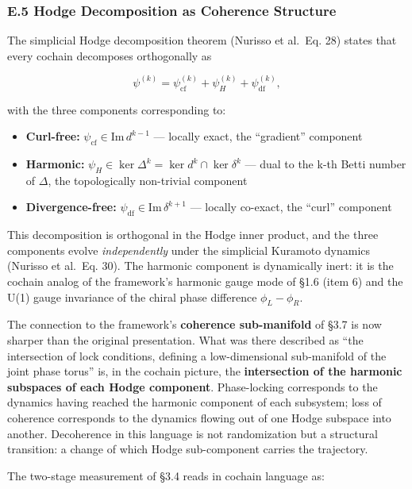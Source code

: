 \documentclass[
]{article}
\providecommand{\tightlist}{%
  \setlength{\itemsep}{0pt}\setlength{\parskip}{0pt}}
\begin{document}
\subsubsection{E.5 Hodge Decomposition as Coherence
Structure}\label{e.5-hodge-decomposition-as-coherence-structure}

The simplicial Hodge decomposition theorem (Nurisso et al.~Eq. 28)
states that every cochain decomposes orthogonally as

\[\boxed{\psi^{(k)} = \psi^{(k)}_{\text{cf}} + \psi^{(k)}_{H} +
\psi^{(k)}_{\text{df}},}\]

with the three components corresponding to:

\begin{itemize}
\tightlist
\item
  \textbf{Curl-free:} \(\psi_{\text{cf}} \in \text{Im}\,d^{k-1}\) ---
  locally exact, the ``gradient'' component
\item
  \textbf{Harmonic:}
  \(\psi_H \in \ker \Delta^k = \ker d^k \cap \ker \delta^k\) --- dual to
  the k-th Betti number of \(\Delta\), the topologically non-trivial
  component
\item
  \textbf{Divergence-free:}
  \(\psi_{\text{df}} \in \text{Im}\,\delta^{k+1}\) --- locally co-exact,
  the ``curl'' component
\end{itemize}

This decomposition is orthogonal in the Hodge inner product, and the
three components evolve \emph{independently} under the simplicial
Kuramoto dynamics (Nurisso et al.~Eq. 30). The harmonic component is
dynamically inert: it is the cochain analog of the framework's harmonic
gauge mode of §1.6 (item 6) and the U(1) gauge invariance of the chiral
phase difference \(\phi_L -
\phi_R\).

The connection to the framework's \textbf{coherence sub-manifold} of
§3.7 is now sharper than the original presentation. What was there
described as ``the intersection of lock conditions, defining a
low-dimensional sub-manifold of the joint phase torus'' is, in the
cochain picture, the \textbf{intersection of the harmonic subspaces of
each Hodge component}. Phase-locking corresponds to the dynamics having
reached the harmonic component of each subsystem; loss of coherence
corresponds to the dynamics flowing out of one Hodge subspace into
another. Decoherence in this language is not randomization but a
structural transition: a change of which Hodge sub-component carries the
trajectory.

The two-stage measurement of §3.4 reads in cochain language as:
\end{document}
